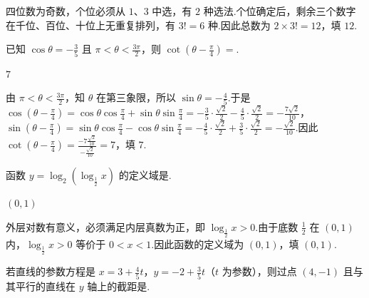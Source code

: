 \begin{solution}
四位数为奇数，个位必须从 \(1\)、\(3\) 中选，有 \(2\) 种选法.个位确定后，剩余三个数字在千位、百位、十位上无重复排列，有 \(3!=6\) 种.因此总数为 \(2\times3!=12\)，填 \(12\).
\end{solution}

\begin{problem}

已知 \(\cos \theta=-\frac{3}{5}\) 且 \(\pi<\theta<\frac{3\pi}{2}\)，则 \(\cot\left( \theta-\frac{\pi}{4} \right)=\)\fillinblank{}.
\end{problem}

\begin{answer}
\(7\)
\end{answer}

\begin{solution}
由 \(\pi<\theta<\frac{3\pi}{2}\)，知 \(\theta\) 在第三象限，所以
\(\sin\theta=-\frac{4}{5}\).于是
\(\cos\left(\theta-\frac{\pi}{4}\right)=\cos\theta\cos\frac{\pi}{4}+\sin\theta\sin\frac{\pi}{4}=-\frac{3}{5}\cdot\frac{\sqrt{2}}{2}-\frac{4}{5}\cdot\frac{\sqrt{2}}{2}=-\frac{7\sqrt{2}}{10}\)，
\(\sin\left(\theta-\frac{\pi}{4}\right)=\sin\theta\cos\frac{\pi}{4}-\cos\theta\sin\frac{\pi}{4}=-\frac{4}{5}\cdot\frac{\sqrt{2}}{2}+\frac{3}{5}\cdot\frac{\sqrt{2}}{2}=-\frac{\sqrt{2}}{10}\).因此
\(\cot\left(\theta-\frac{\pi}{4}\right)=\frac{-7\frac{\sqrt{2}}{10}}{-\frac{\sqrt{2}}{10}}=7\)，填 \(7\).
\end{solution}

\begin{problem}

函数 \(y=\log_2\left( \log_{\frac{1}{2}}x \right)\) 的定义域是\fillinblank{}.
\end{problem}

\begin{answer}
\((0,1)\)
\end{answer}

\begin{solution}
外层对数有意义，必须满足内层真数为正，即
\(\log_{\frac{1}{2}}x>0\).由于底数 \(\frac{1}{2}\) 在 \((0,1)\) 内，\(\log_{\frac{1}{2}}x>0\) 等价于 \(0<x<1\).因此函数的定义域为 \((0,1)\)，填 \((0,1)\).
\end{solution}

\begin{problem}

若直线的参数方程是 \(x=3+\frac{4}{5}t\)，\(y=-2+\frac{3}{5}t\)（\(t\) 为参数），则过点 \((4,-1)\) 且与其平行的直线在 \(y\) 轴上的截距是\fillinblank{}.
\end{problem}

